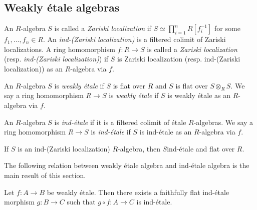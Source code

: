 \begin{lemma}

\section{Weakly étale algebras}

\begin{definition}
    \label{def:ind-zariski-localization}

    An $R$-algebra $S$ is called a \textit{Zariski localization} if $S \simeq \prod_{i=1}^n R[f_i^{-1}]$ for some $f_1,\dots,f_n \in R$. An \textit{ind-(Zariski localization)} is a filtered colimit of Zariski localizations. A ring homomorphism $f : R \to S$ is called a \textit{Zariski localization} (resp. \emph{ind-(Zariski localization)}) if $S$ is Zariski localization (resp. ind-(Zariski localization)) as an $R$-algebra via $f$.
\end{definition}

\begin{definition}
    An $R$-algebra $S$ is \emph{weakly étale} if $S$ is flat over $R$ and
    $S$ is flat over $S \otimes_{R} S$. We say a ring homomorphism
    $R \to S$ is \emph{weakly étale} if $S$ is weakly étale as an $R$-algebra via $f$.
    \label{def:weakly-etale-algebra}
\end{definition}

\begin{definition}
    An $R$-algebra $S$ is \emph{ind-étale} if it is a filtered colimit of étale $R$-algebras.
    We say a ring homomorphism $R \to S$ is \emph{ind-étale} if $S$ is ind-étale as an $R$-algebra via $f$.
    \label{def:ind-etale-algebra}
\end{definition}

\begin{lemma}
    \label{lem:ind-etale-flat-of-ind-Zariski}

    If \(S\) is an ind-(Zariski localization) \(R\)-algebra, then \(S\)ind-étale and flat over \(R\).
\end{lemma}

The following relation between weakly étale algebra and ind-étale algebra is the main result of this section.
\begin{theorem}
Let $f: A \to B$ be weakly étale. Then there exists a faithfully flat ind-étale morphism $g: B \to C$ such that $g \circ f: A \to C$ is ind-étale.
    \label{thm:weakly-etale-ind-etale}
\end{theorem}


\end{lemma}
